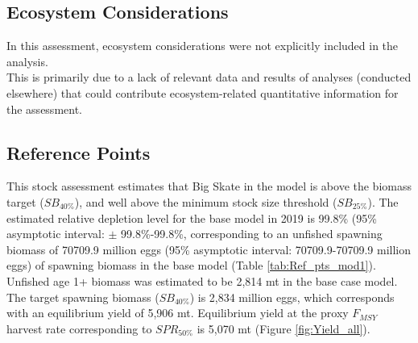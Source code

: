 \documentclass[12pt,]{article}
\begin{document}
\FloatBarrier

\hypertarget{ecosystem-considerations}{%
\subsection*{Ecosystem Considerations}\label{ecosystem-considerations}}

In this assessment, ecosystem considerations were not explicitly
included in the analysis.\\
This is primarily due to a lack of relevant data and results of analyses
(conducted elsewhere) that could contribute ecosystem-related
quantitative information for the assessment.

\hypertarget{reference-points}{%
\subsection*{Reference Points}\label{reference-points}}

This stock assessment estimates that Big Skate in the model is above the
biomass target (\(SB_{40\%}\)), and well above the minimum stock size
threshold (\(SB_{25\%}\)). The estimated relative depletion level for
the base model in 2019 is 99.8\% (95\% asymptotic interval: \(\pm\)
99.8\%-99.8\%, corresponding to an unfished spawning biomass of 70709.9
million eggs (95\% asymptotic interval: 70709.9-70709.9 million eggs) of
spawning biomass in the base model (Table \ref{tab:Ref_pts_mod1}).
Unfished age 1+ biomass was estimated to be 2,814 mt in the base case
model. The target spawning biomass (\(SB_{40\%}\)) is 2,834 million
eggs, which corresponds with an equilibrium yield of 5,906 mt.
Equilibrium yield at the proxy \(F_{MSY}\) harvest rate corresponding to
\(SPR_{50\%}\) is 5,070 mt (Figure \ref{fig:Yield_all}).

\FloatBarrier
\end{document}
